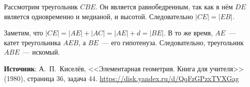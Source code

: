\documentclass{article} %
\begin{document}
Рассмотрим треугольник $CBE$. Он является равнобедренным, так как в нём $DE$ является одновременно и медианой, и высотой. Следовательно $|CE| = |EB|$.

Заметим, что $|CE| = |AE| + |AC| = |AE| + d = |BE|$. В то же время, $AE$~--- катет треугольника $AEB$, а $BE$~--- его гипотенуза. Следовательно, треугольник $ABE$~--- искомый. 

\begin{center}
\end{center}

\textbf{Источник}: А.~П.~Киселёв, <<Элементарная геометрия. Книга для учителя>> (1980), страница 36, задача 44. \url{https://disk.yandex.ru/d/QqFzGPzxTVXGag}
\end{document}
